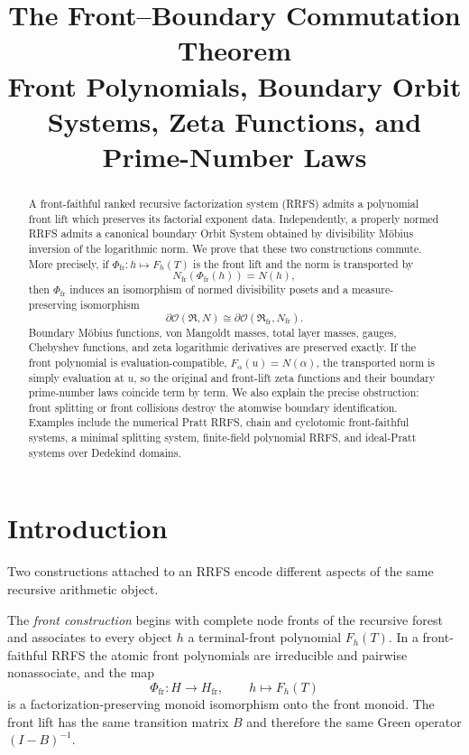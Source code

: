 \documentclass[11pt]{article}
\title{\textbf{The Front--Boundary Commutation Theorem}\\
\large Front Polynomials, Boundary Orbit Systems, Zeta Functions, and Prime-Number Laws}
\author{}
\date{}
\newcommand{\cR}{\mathfrak R}
\newcommand{\cO}{\mathcal O}
\newcommand{\fr}{\mathrm{fr}}
\newcommand{\bd}{\partial}
\begin{document}
\maketitle

\begin{abstract}
A front-faithful ranked recursive factorization system (RRFS) admits a polynomial front lift which preserves its factorial exponent data. Independently, a properly normed RRFS admits a canonical boundary Orbit System obtained by divisibility M\"obius inversion of the logarithmic norm. We prove that these two constructions commute. More precisely, if $\Phi_{\fr}:h\mapsto F_h(T)$ is the front lift and the norm is transported by
\[
N_{\fr}(\Phi_{\fr}(h))=N(h),
\]
then $\Phi_{\fr}$ induces an isomorphism of normed divisibility posets and a measure-preserving isomorphism
\[
\bd\cO(\cR,N)\cong \bd\cO(\cR_{\fr},N_{\fr}).
\]
Boundary M\"obius functions, von Mangoldt masses, total layer masses, gauges, Chebyshev functions, and zeta logarithmic derivatives are preserved exactly. If the front polynomial is evaluation-compatible, $F_\alpha(u)=N(\alpha)$, the transported norm is simply evaluation at $u$, so the original and front-lift zeta functions and their boundary prime-number laws coincide term by term. We also explain the precise obstruction: front splitting or front collisions destroy the atomwise boundary identification. Examples include the numerical Pratt RRFS, chain and cyclotomic front-faithful systems, a minimal splitting system, finite-field polynomial RRFS, and ideal-Pratt systems over Dedekind domains.
\end{abstract}

\tableofcontents

\section{Introduction}

Two constructions attached to an RRFS encode different aspects of the same recursive arithmetic object.

The \emph{front construction} begins with complete node fronts of the recursive forest and associates to every object $h$ a terminal-front polynomial $F_h(T)$. In a front-faithful RRFS the atomic front polynomials are irreducible and pairwise nonassociate, and the map
\[
\Phi_{\fr}:H\longrightarrow H_{\fr},\qquad h\longmapsto F_h(T)
\]
is a factorization-preserving monoid isomorphism onto the front monoid. The front lift has the same transition matrix $B$ and therefore the same Green operator $(I-B)^{-1}$.
\end{document}
